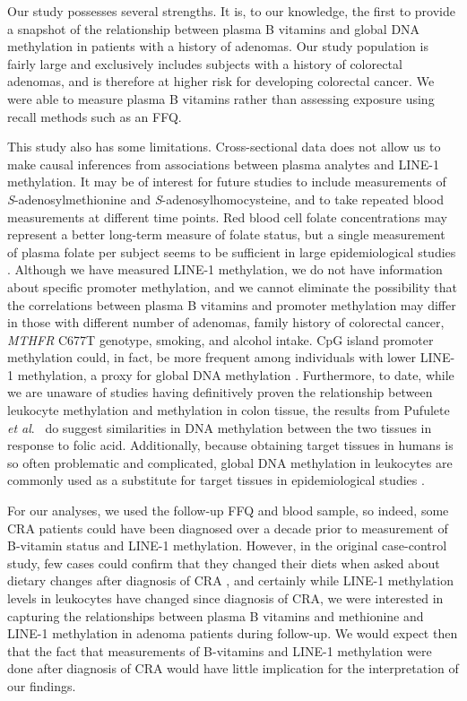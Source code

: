\noindent Our study possesses several strengths. It is, to our knowledge, the first to provide a snapshot of the relationship between plasma B vitamins and global DNA methylation in patients with a history of adenomas. Our study population is fairly large and exclusively includes subjects with a history of colorectal adenomas, and is therefore at higher risk for developing colorectal cancer. We were able to measure plasma B vitamins rather than assessing exposure using recall methods such as an FFQ.

\noindent This study also has some limitations. Cross-sectional data does not allow us to make causal inferences from associations between plasma analytes and LINE-1 methylation. It may be of interest for future studies to include measurements of \emph{S}-adenosylmethionine and \emph{S}-adenosylhomocysteine, and to take repeated blood measurements at different time points. Red blood cell folate concentrations may represent a better long-term measure of folate status, but a single measurement of plasma folate per subject seems to be sufficient in large epidemiological studies \cite{c560}. Although we have measured LINE-1 methylation, we do not have information about specific promoter methylation, and we cannot eliminate the possibility that the correlations between plasma B vitamins and promoter methylation may differ in those with different number of adenomas, family history of colorectal cancer, \emph{MTHFR} C677T genotype, smoking, and alcohol intake. CpG island promoter methylation could, in fact, be more frequent among individuals with lower LINE-1 methylation, a proxy for global DNA methylation \cite{c561}. Furthermore, to date, while we are unaware of studies having definitively proven the relationship between leukocyte methylation and methylation in colon tissue, the results from Pufulete \emph{et al}.~\cite{c552} do suggest similarities in DNA methylation between the two tissues in response to folic acid. Additionally, because obtaining target tissues in humans is so often problematic and complicated, global DNA methylation in leukocytes are commonly used as a substitute for target tissues in epidemiological studies  \cite{c57,c58,c59,c510}.

\noindent For our analyses, we used the follow-up FFQ and blood sample, so indeed, some CRA patients could have been diagnosed over a decade prior to measurement of B-vitamin status and LINE-1 methylation. However, in the original case-control study, few cases could confirm that they changed their diets when asked about dietary changes after diagnosis of CRA \cite{c562}, and certainly while LINE-1 methylation levels in leukocytes have changed since diagnosis of CRA, we were interested in capturing the relationships between plasma B vitamins and methionine and LINE-1 methylation in adenoma patients during follow-up. We would expect then that the fact that measurements of B-vitamins and LINE-1 methylation were done after diagnosis of CRA would have little implication for the interpretation of our findings.

